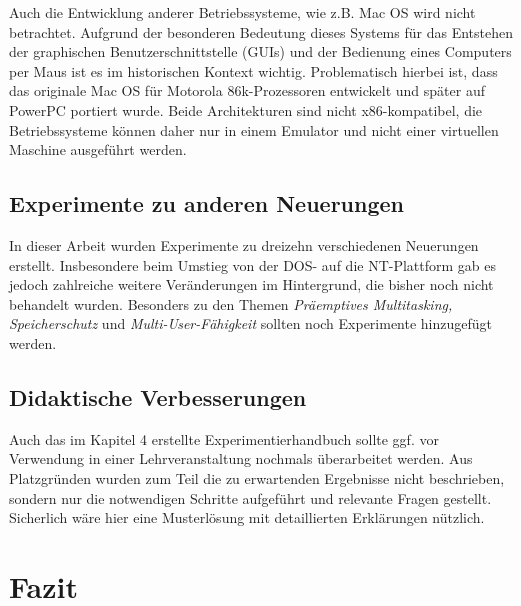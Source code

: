 		Auch die Entwicklung anderer Betriebssysteme, wie z.B. Mac OS wird nicht betrachtet.
		Aufgrund der besonderen Bedeutung dieses Systems für das Entstehen der graphischen Benutzerschnittstelle (GUIs) und der Bedienung eines Computers per Maus ist es im historischen Kontext wichtig. 
		Problematisch hierbei ist, dass das originale Mac OS für Motorola 86k-Prozessoren entwickelt und später auf PowerPC portiert wurde.
		Beide Architekturen sind nicht x86-kompatibel, die Betriebssysteme können daher nur in einem Emulator und nicht einer virtuellen Maschine ausgeführt werden.

		\subsection{Experimente zu anderen Neuerungen}

		In dieser Arbeit wurden Experimente zu dreizehn verschiedenen Neuerungen erstellt.
		Insbesondere beim Umstieg von der DOS- auf die NT-Plattform gab es jedoch zahlreiche weitere Veränderungen im Hintergrund, die bisher noch nicht behandelt wurden. 
		Besonders zu den Themen \emph{Präemptives Multitasking, Speicherschutz} und \emph{Multi-User-Fähigkeit} sollten noch Experimente hinzugefügt werden.

		\subsection{Didaktische Verbesserungen}

		Auch das im Kapitel 4 erstellte Experimentierhandbuch sollte ggf. vor Verwendung in einer Lehrveranstaltung nochmals überarbeitet werden. 
		Aus Platzgründen wurden zum Teil die zu erwartenden Ergebnisse nicht beschrieben, sondern nur die notwendigen Schritte aufgeführt und relevante Fragen gestellt.
		Sicherlich wäre hier eine Musterlösung mit detaillierten Erklärungen nützlich.

\section{Fazit}
\label{sec:evaluation}
	